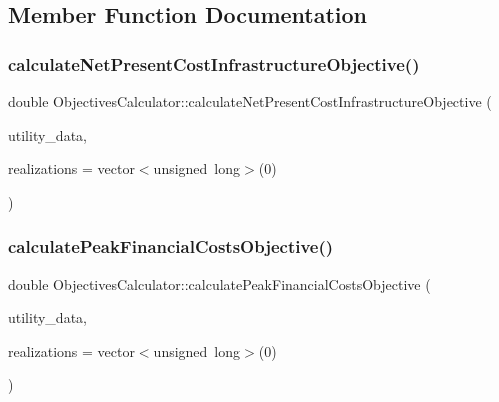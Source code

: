 \subsection{Member Function Documentation}
\mbox{\label{classObjectivesCalculator_a5619e4472f8e96bc6fa274002d4809f1_a5619e4472f8e96bc6fa274002d4809f1}} 
\subsubsection{\texorpdfstring{calculate\+Net\+Present\+Cost\+Infrastructure\+Objective()}{calculateNetPresentCostInfrastructureObjective()}}
{\footnotesize\ttfamily double Objectives\+Calculator\+::calculate\+Net\+Present\+Cost\+Infrastructure\+Objective (\begin{DoxyParamCaption}\item[{const vector$<$ \mbox{\hyperlink{classUtilitiesDataCollector}{Utilities\+Data\+Collector}} $\ast$$>$ \&}]{utility\+\_\+data,  }\item[{vector$<$ unsigned long $>$}]{realizations = {\ttfamily vector$<$unsigned~long$>$(0)} }\end{DoxyParamCaption})\hspace{0.3cm}{\ttfamily [static]}}

\mbox{\label{classObjectivesCalculator_a2352c178eab40798324120102cc7891b_a2352c178eab40798324120102cc7891b}} 
\subsubsection{\texorpdfstring{calculate\+Peak\+Financial\+Costs\+Objective()}{calculatePeakFinancialCostsObjective()}}
{\footnotesize\ttfamily double Objectives\+Calculator\+::calculate\+Peak\+Financial\+Costs\+Objective (\begin{DoxyParamCaption}\item[{const vector$<$ \mbox{\hyperlink{classUtilitiesDataCollector}{Utilities\+Data\+Collector}} $\ast$$>$ \&}]{utility\+\_\+data,  }\item[{vector$<$ unsigned long $>$}]{realizations = {\ttfamily vector$<$unsigned~long$>$(0)} }\end{DoxyParamCaption})\hspace{0.3cm}{\ttfamily [static]}}

